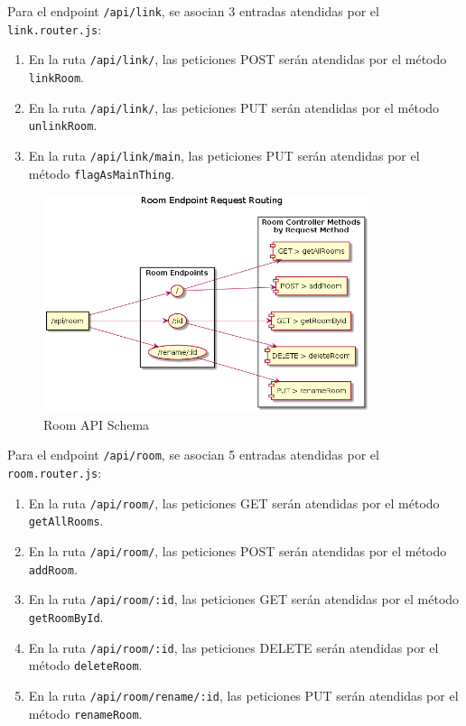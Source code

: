 Para el endpoint \verb|/api/link|, se asocian 3 entradas atendidas por el \verb|link.router.js|:
\begin{enumerate}
\item En la ruta \verb|/api/link/|, las peticiones POST serán atendidas por el método \verb|linkRoom|.
\item En la ruta \verb|/api/link/|, las peticiones PUT serán atendidas por el método \verb|unlinkRoom|.
\item En la ruta \verb|/api/link/main|, las peticiones PUT serán atendidas por el método \verb|flagAsMainThing|.
\end{enumerate}

\begin{figure}[hbt!]
\centering
\includegraphics[height=2.5in]{figures/diagrams/back/router-flow/room-endpoints.png}
\caption[room-endpoints]{Room API Schema\footnotemark}
\end{figure}

Para el endpoint \verb|/api/room|, se asocian 5 entradas atendidas por el \verb|room.router.js|:
\begin{enumerate}
\item En la ruta \verb|/api/room/|, las peticiones GET serán atendidas por el método \verb|getAllRooms|.
\item En la ruta \verb|/api/room/|, las peticiones POST serán atendidas por el método \verb|addRoom|.
\item En la ruta \verb|/api/room/:id|, las peticiones GET serán atendidas por el método \verb|getRoomById|.
\item En la ruta \verb|/api/room/:id|, las peticiones DELETE serán atendidas por el método \verb|deleteRoom|.
\item En la ruta \verb|/api/room/rename/:id|, las peticiones PUT serán atendidas por el método \verb|renameRoom|.
\end{enumerate}


